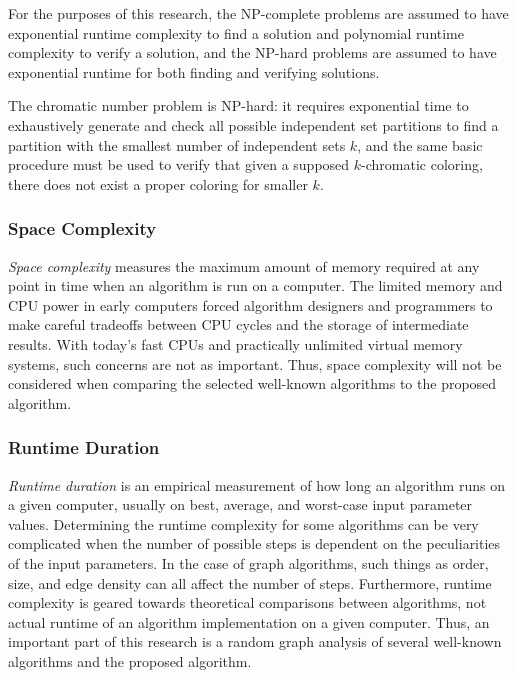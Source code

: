 For the purposes of this research, the NP-complete problems are assumed to have exponential runtime complexity to
find a solution and polynomial runtime complexity to verify a solution, and the NP-hard problems are assumed to
have exponential runtime for both finding and verifying solutions.

The chromatic number problem is NP-hard: it requires exponential time to exhaustively generate and check all
possible independent set partitions to find a partition with the smallest number of independent sets \(k\), and the
same basic procedure must be used to verify that given a supposed \(k\)-chromatic coloring, there does not exist a
proper coloring for smaller \(k\).

\subsubsection{Space Complexity}\label{sec:sub:sub:space}

\emph{Space complexity} measures the maximum amount of memory required at any point in time when an algorithm is
run on a computer.  The limited memory and CPU power in early computers forced algorithm designers and programmers
to make careful tradeoffs between CPU cycles and the storage of intermediate results.  With today's fast CPUs and
practically unlimited virtual memory systems, such concerns are not as important.  Thus, space complexity will not
be considered when comparing the selected well-known algorithms to the proposed algorithm.

\subsubsection{Runtime Duration}\label{sec:sub:sub:duration}

\emph{Runtime duration} is an empirical measurement of how long an algorithm runs on a given computer, usually on
best, average, and worst-case input parameter values.  Determining the runtime complexity for some algorithms can
be very complicated when the number of possible steps is dependent on the peculiarities of the input parameters.
In the case of graph algorithms, such things as order, size, and edge density can all affect the number of steps.
Furthermore, runtime complexity is geared towards theoretical comparisons between algorithms, not actual runtime of
an algorithm implementation on a given computer.  Thus, an important part of this research is a random graph
analysis of several well-known algorithms and the proposed algorithm.

